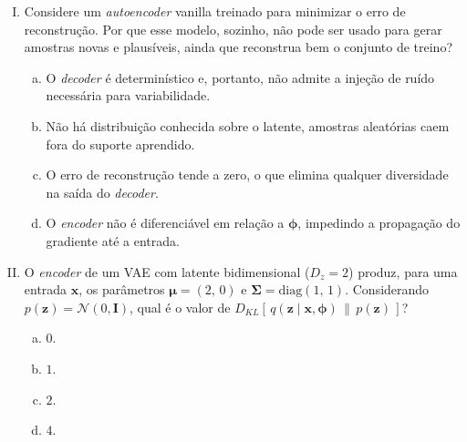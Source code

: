 \documentclass{dlproblemset}
\begin{document}
\begin{enumerate}[I)]
    \item Considere um \textit{autoencoder} vanilla treinado para minimizar o erro de reconstrução. Por que esse modelo, sozinho, não pode ser usado para gerar amostras novas e plausíveis, ainda que reconstrua bem o conjunto de treino?
    \begin{enumerate}[(a)]
        \item O \textit{decoder} é determinístico e, portanto, não admite a injeção de ruído necessária para variabilidade.
        \item Não há distribuição conhecida sobre o latente, amostras aleatórias caem fora do suporte aprendido.
        \item O erro de reconstrução tende a zero, o que elimina qualquer diversidade na saída do \textit{decoder}.
        \item O \textit{encoder} não é diferenciável em relação a $\boldsymbol{\phi}$, impedindo a propagação do gradiente até a entrada.
    \end{enumerate}

    \item O \textit{encoder} de um VAE com latente bidimensional ($D_z = 2$) produz, para uma entrada $\mathbf{x}$, os parâmetros $\boldsymbol{\mu} = (2,\, 0)$ e $\boldsymbol{\Sigma} = \mathrm{diag}(1,\, 1)$. Considerando $p(\mathbf{z}) = \mathcal{N}(0, \mathbf{I})$, qual é o valor de $D_{KL}\!\left[\,q(\mathbf{z} \mid \mathbf{x}, \boldsymbol{\phi})\,\|\,p(\mathbf{z})\,\right]$?
    \begin{enumerate}[(a)]
        \item $0$.
        \item $1$.
        \item $2$.
        \item $4$.
    \end{enumerate}


\end{enumerate}
\end{document}
